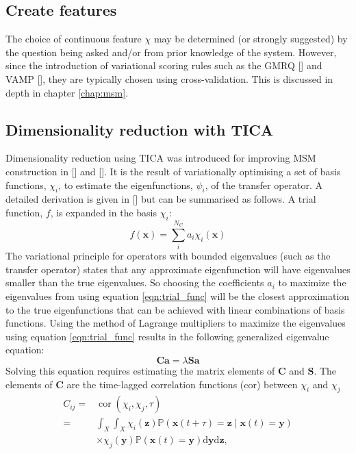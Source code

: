 \subsection{Create features}
The choice of continuous feature $\chi$ may be determined (or strongly suggested) by the question being asked and/or from prior knowledge of the system. However, since the introduction of variational scoring rules such as the GMRQ [] and VAMP [], they are typically chosen using cross-validation. This is discussed in depth in chapter \ref{chap:msm}. 

\subsection{Dimensionality reduction with TICA}

Dimensionality reduction using TICA was introduced for improving MSM construction in [] and []. It is the result of variationally optimising a set of basis functions, $\chi_{i}$, to estimate the eigenfunctions, $\psi_{i}$, of the transfer operator. A detailed derivation is given in [] but can be summarised as follows. A trial function, $f$, is expanded in the basis $\chi_{i}$: 
\begin{equation}\label{eqn:trial_func}
    f(\mathbf{x}) = \sum^{N_{C}}_{i}a_{i}\chi_{i}(\mathbf{x})
\end{equation}
The variational principle for operators with bounded eigenvalues (such as the transfer operator) states that any approximate eigenfunction will have eigenvalues smaller than the true eigenvalues. So choosing the coefficients $a_{i}$ to maximize the eigenvalues from using equation \ref{eqn:trial_func} will be the closest approximation to the true eigenfunctions that can be achieved with linear combinations of basis functions. Using the method of Lagrange multipliers to maximize the eigenvalues using equation \ref{eqn:trial_func} results in the following generalized eigenvalue equation: \begin{equation}\label{eqn:general_ev_equation}
    \mathbf{C}\mathbf{a} = \lambda \mathbf{S}\mathbf{a}
\end{equation}
Solving this equation requires estimating the matrix elements of $\mathbf{C}$ and $\mathbf{S}$. The elements of $\mathbf{C}$ are the time-lagged correlation functions ($\mathrm{cor}$) between $\chi_{i}$ and $\chi_{j}$
\begin{equation}
    \begin{split}
        C_{ij} =& \operatorname{cor}\left(\chi_{i}, \chi_{j}, \tau\right)\\
        =& \int_{X} \int_{X} \chi_{i}(\mathbf{z}) \mathbb{P}\left(\mathbf{x}(t+\tau)=\mathbf{z} \mid \mathbf{x}(t)=\mathbf{y}\right) \\
        & \times \chi_{j}(\mathbf{y}) \mathbb{P}\left(\mathbf{x}(t)=\mathbf{y}\right) \mathrm{d} \mathbf{y} \mathrm{d}\mathbf{z},        
    \end{split}
\end{equation}
